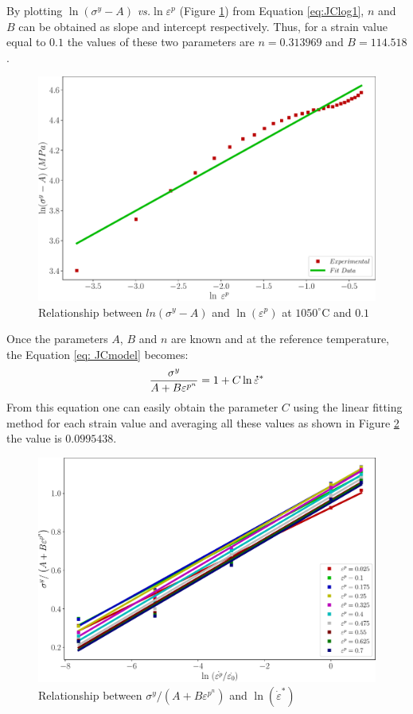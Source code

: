\documentclass[twoside,english,1p,final,sort&compress]{elsarticle}
\makeatletter
\theoremstyle{plain}
\newcommand{\mdot}[1]{\accentset{\mbox{\bfseries .}}{#1}}
\newcommand*{\versus}{\emph{vs.}\@\xspace}
\makeatother
\begin{document}
By plotting $\ln(\sigma^y-A)$ \versus $\ln\varepsilon^p$ (Figure \ref{fig:JCSigmaAB}) from Equation \ref{eq:JClog1}, $n$ and $B$ can be obtained as slope and intercept respectively. Thus, for a strain value equal to $0.1$ the values of these two parameters are $n=0.313969$ and $B=114.518$.
\begin{figure}[!ht]
\centering
\includegraphics[width=0.9\columnwidth]
{newFigures/JCSigmaAB}
\caption{Relationship between $ln(\sigma^y -A)$ and $\ln(\varepsilon^p)$ at $1050^\circ$C and $0.1$}
\label{fig:JCSigmaAB}
\end{figure}
\FloatBarrier
Once the parameters $A$, $B$ and $n$ are known and at the reference temperature, the Equation \ref{eq: JCmodel} becomes:
\begin{equation}
\frac{\sigma^y}{A + B\varepsilon^{p^n}} = 1 + C\ln\mdot{\varepsilon}^*
\end{equation}
From this equation one can easily obtain the parameter $C$ using the linear fitting method for each strain value and averaging all these values as shown in Figure \ref{fig:JCSigmaAB1} the value is $0.0995438$. 
\begin{figure}[!ht]
\centering
\includegraphics[width=0.9\columnwidth]
{newFigures/JCSigmaAB1}
\caption{Relationship between $\sigma^y/(A+ B\varepsilon^{p^n})$ and $\ln(\dot{\varepsilon}^*)$}
\label{fig:JCSigmaAB1}
\end{figure}
\end{document}
